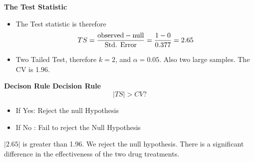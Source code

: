 \documentclass[a4paper,12pt]{article}
\begin{document}


\noindent \textbf{The Test Statistic}
\begin{itemize}
\item The Test statistic is therefore
\[ TS = {\mbox{observed} - \mbox{null} \over \mbox{Std. Error}}  = {1 - 0 \over 0.377 } = 2.65 \]
\item Two Tailed Test, therefore $k = 2$, and $\alpha = 0.05$. Also two large samples. The CV is 1.96.
\end{itemize}




\noindent \textbf{Decison Rule}
\textbf{Decision Rule}
\[ |TS| > CV ?  \]
\begin{itemize}
\item If Yes: Reject the null Hypothesis
\item If No : Fail to reject the Null Hypothesis
\end{itemize}
$|2.65|$ is greater than 1.96. We reject the null hypothesis. There is a significant difference in the effectiveness of the two drug treatments.




\end{document}
